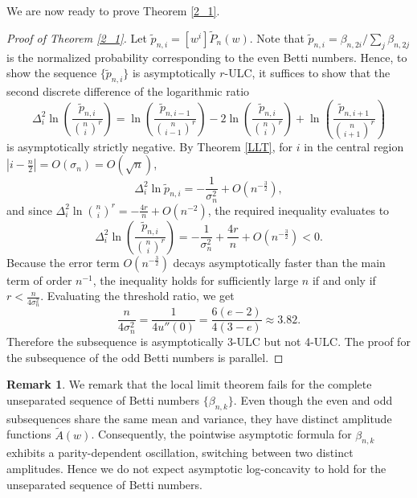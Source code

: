 \documentclass[11pt,letterpaper]{amsart}
\numberwithin{equation}{section}
\theoremstyle{definition}
\newtheorem{remark}[theorem]{Remark}
\begin{document}
We are now ready to prove Theorem \ref{2_1}.
\begin{proof}[Proof of Theorem \ref{2_1}]
  Let $\tilde{p}_{n,i}= [w^i]\tilde{P}_n(w) $. Note that $\tilde{p}_{n,i}= \beta_{n,2i} / \sum_j \beta_{n,2j}$ is the normalized probability corresponding to the even Betti numbers. Hence, to show the sequence $\{\tilde{p}_{n,i}\}$ is asymptotically $r$-ULC, it suffices to show that the second discrete difference of the logarithmic ratio
  \[\Delta^2_i \ln \left(\frac{\tilde{p}_{n,i}}{\binom{n}{i}^r}\right) =\ln \left(\frac{\tilde{p}_{n,i-1}}{\binom{n}{i-1}^r}\right)-2 \ln \left(\frac{\tilde{p}_{n,i}}{\binom{n}{i}^r}\right)+\ln \left(\frac{\tilde{p}_{n,i+1}}{\binom{n}{i+1}^r}\right) \]
  is asymptotically strictly negative.
  By Theorem \ref{LLT}, for $i$ in the central region $|i - \frac{n}{2}|=O(\sigma_n)=O(\sqrt{n})$,
  \[ \Delta^2_i \ln \tilde{p}_{n,i} = - \frac{1}{\sigma_n^2}+ O\left( n^{-\frac{3}{2}}\right), \]
  and since $\Delta^2_i \ln {\binom{n}{i}^r}= - \frac{4r}{n}+ O\left( n^{-2}\right)$, the required inequality evaluates to
  \[\Delta^2_i \ln \left(\frac{\tilde{p}_{n,i}}{\binom{n}{i}^r}\right) = - \frac{1}{\sigma_n^2}+\frac{4r}{n}+O\left( n^{-\frac{3}{2}}\right)<0.\]
  Because the error term $O\left( n^{-\frac{3}{2}}\right)$ decays asymptotically faster than the main term of order $n^{-1}$, the inequality holds for sufficiently large $n$ if and only if $r< \frac{n}{4\sigma_n^2}$. Evaluating the threshold ratio, we get
  \[ \frac{n}{4\sigma_n^2} = \frac{1}{4 u''(0)}= \frac{6(e-2)}{4 (3-e)}\approx 3.82. \]
  Therefore the subsequence is asymptotically 3-ULC but not 4-ULC. The proof for the subsequence of the odd Betti numbers is parallel.
\end{proof}
  




\begin{remark}
  We remark that the local limit theorem fails for the complete unseparated sequence of Betti numbers $\{\beta_{n,k}\}$. Even though the even and odd subsequences share the same mean and variance, they have distinct amplitude functions $\tilde{A}(w)$. Consequently, the pointwise asymptotic formula for $\beta_{n,k}$ exhibits a parity-dependent oscillation, switching between two distinct amplitudes. Hence we do not expect asymptotic log-concavity to hold for the unseparated sequence of Betti numbers.
\end{remark}
\end{document}
